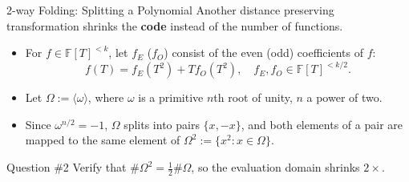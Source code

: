\documentclass{zkdl-presentation-template}
\begin{document}
    \begin{frame}{2-way Folding: Splitting a Polynomial}
        Another distance preserving transformation shrinks the \textbf{code} instead of the number of functions.
        \pause
        \begin{itemize}
            \item For $f \in \mathbb{F}[T]^{<k}$, let $f_E$ ($f_O$) consist of the even (odd) coefficients of $f$:
            \begin{equation*}
                f(T) = f_E(T^2) + T f_O(T^2), \quad f_E, f_O \in \mathbb{F}[T]^{<k/2}.
            \end{equation*}
            \pause
            \vspace{-10pt}
            \item Let $\Omega := \langle \omega \rangle$, where $\omega$ is a primitive $n$th root of unity, $n$ a power of two.\pause
            \item Since $\omega^{n/2} = -1$, $\Omega$ splits into pairs $\{x, -x\}$, and both elements of a pair are mapped to the same element of $\Omega^2 := \{x^2 : x \in \Omega\}$.
        \end{itemize}
        \pause

        \begin{questionblock}{Question \#2}
            Verify that $\#\Omega^2 = \frac{1}{2}\#\Omega$, so the evaluation domain shrinks $2\times$.
        \end{questionblock}
    \end{frame}
\end{document}
